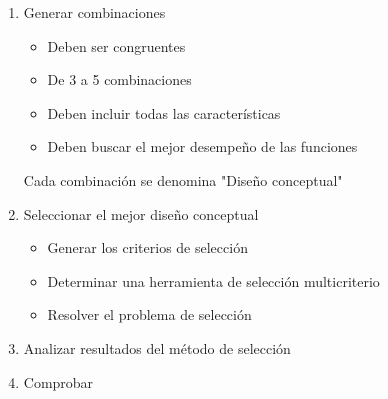 \begin{enumerate}
        \item Generar combinaciones
        \begin{itemize}
            \item Deben ser congruentes
            \item De 3 a 5 combinaciones
            \item Deben incluir todas las características
            \item Deben buscar el mejor desempeño de las funciones
        \end{itemize}
        Cada combinación se denomina "Diseño conceptual"
        
        \item Seleccionar el mejor diseño conceptual
        \begin{itemize}
            \item Generar los criterios de selección
            \item Determinar una herramienta de selección multicriterio 
            \item Resolver el problema de selección
        \end{itemize}
        
        \item Analizar resultados del método de selección
        
        \item Comprobar
\end{enumerate}